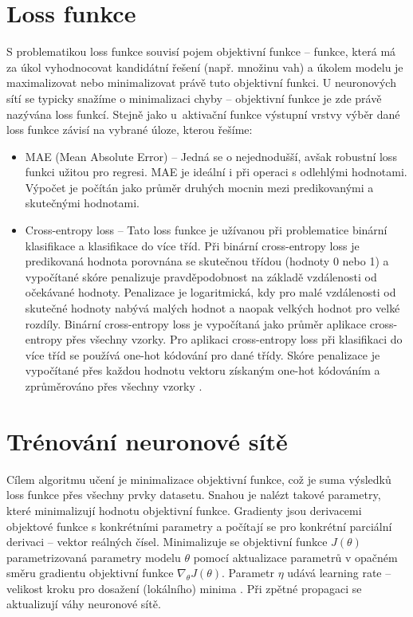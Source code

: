 \section{Loss funkce}
S problematikou loss funkce souvisí pojem objektivní funkce -- funkce, která má za úkol vyhodnocovat kandidátní řešení (např. množinu vah) a úkolem modelu je maximalizovat nebo minimalizovat právě tuto objektivní funkci. U neuronových sítí se typicky snažíme o minimalizaci chyby -- objektivní funkce je zde právě nazývána loss funkcí. Stejně jako u~aktivační funkce výstupní vrstvy výběr dané loss funkce závisí na vybrané úloze, kterou řešíme:
\begin{itemize}
    \item MAE (Mean Absolute Error) -- Jedná se o nejednodušší, avšak robustní loss funkci užitou pro regresi. MAE je ideální i při operaci s odlehlými hodnotami. Výpočet je počítán jako průměr druhých mocnin mezi predikovanými a skutečnými hodnotami.
    \item Cross-entropy loss -- Tato loss funkce je užívanou při problematice binární klasifikace a klasifikace do více tříd. Při binární cross-entropy loss je predikovaná hodnota porovnána se skutečnou třídou (hodnoty 0 nebo 1) a vypočítané skóre penalizuje pravděpodobnost na základě vzdálenosti od očekávané hodnoty. Penalizace je logaritmická, kdy pro malé vzdálenosti od skutečné hodnoty nabývá malých hodnot a naopak velkých hodnot pro velké rozdíly. Binární cross-entropy loss je vypočítaná jako průměr aplikace cross-entropy přes všechny vzorky. Pro aplikaci cross-entropy loss při klasifikaci do více tříd se používá one-hot kódování pro dané třídy. Skóre penalizace je vypočítané přes každou hodnotu vektoru získaným one-hot kódováním a zprůměrováno přes všechny vzorky \cite{LossFunctions}.
\end{itemize}
\section{Trénování neuronové sítě}
Cílem algoritmu učení je minimalizace objektivní funkce, což je suma výsledků loss funkce přes všechny prvky datasetu. Snahou je nalézt takové parametry, které minimalizují hodnotu objektivní funkce. Gradienty jsou derivacemi objektové funkce s konkrétními parametry a počítají se pro konkrétní parciální derivaci -- vektor reálných čísel. Minimalizuje se objektivní funkce $J(\theta)$ parametrizovaná parametry modelu $\theta$ pomocí aktualizace parametrů v opačném směru gradientu objektivní funkce $\nabla_{\theta}J(\theta)$. Parametr $\eta$ udává learning rate -- velikost kroku pro dosažení (lokálního) minima \cite{GradientDescent}. Při zpětné propagaci se aktualizují váhy neuronové sítě.

